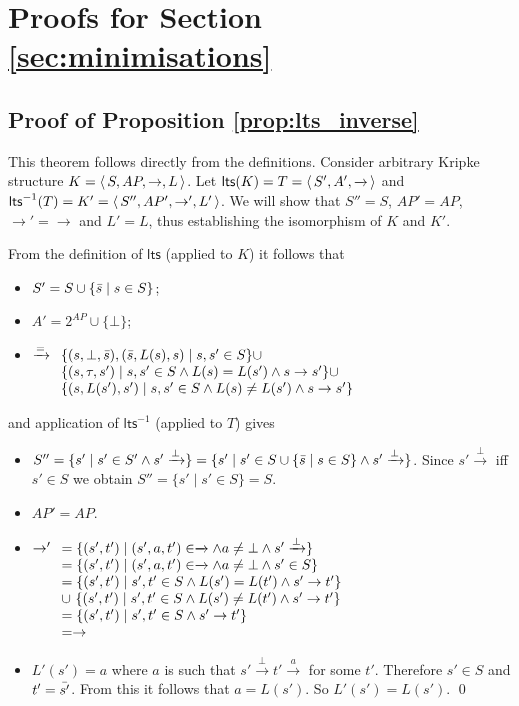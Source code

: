 \documentclass{llncs}
\newcommand{\ltstrans}[1]{\xrightarrow{#1}}
\newcommand{\kstrans}{\to}
\newcommand{\lts}{\mathsf{lts}}
\newcommand{\ltsrev}{\lts^{-1}}
\begin{document}
\section{Proofs for Section \ref{sec:minimisations}}

\subsection{Proof of Proposition \ref{prop:lts_inverse}}
\label{pf:prop:lts_inverse}

This theorem follows directly from the definitions.
Consider arbitrary Kripke structure $K = \tuple{S,AP,\kstrans,L}$. Let $\lts(K) = T= \tuple{ S',A',\ltstrans{}}$ and $\ltsrev(T) = K'=\tuple{S'',AP',\kstrans',L'}$. We will show that $S''=S$, $AP'=AP$, $\kstrans'=\kstrans$ and $L'=L$, thus establishing the isomorphism of $K$ and $K'$.

From the definition of $\lts$ (applied to $K$) it follows that
\begin{itemize}
\item $S'= S \cup \{ \bar{s} \mid s \in S \}$;
\item $A' = 2^{AP} \cup \{ \bot \}$;
\item $\ltstrans = \begin{array}[t]{l}
\{ (s,\bot,\shadow{s}), (\shadow{s},L(s),s) \mid s,s'\in S \} \cup ~ \\
\{ (s,\tau,s') \mid s,s'\in S \land L(s)=L(s') \land s \kstrans s' \} \cup ~ \\
\{ (s,L(s'),s') \mid s,s'\in S \land L(s) \neq L(s') \land s \kstrans s' \}
\end{array}$
\end{itemize}
and application of $\ltsrev$ (applied to $T$) gives
\begin{itemize}
\item $S''= \{ s' \mid s' \in S' \land s' \ltstrans{\bot} \} = \{ s' \mid s' \in S \cup \{ \shadow{s} \mid s \in S \} \land s' \ltstrans{\bot} \}$. Since $s'\ltstrans{\bot}$ iff $s'\in S$ we obtain
    $S'' = \{ s' \mid s' \in S \} = S$.
\item $AP' = AP$.
\item $\kstrans'
\begin{array}[t]{l}
= \{ (s',t') \mid (s',a,t') \in \ltstrans{} \land a \neq \bot \land s' \ltstrans{\bot} \} \\
= \{ (s',t') \mid (s',a,t') \in \ltstrans{} \land a \neq \bot \land s' \in S \} \\
= \{ (s',t') \mid s', t' \in S \land L(s') =L(t') \land s' \kstrans t' \} \\
\cup \ \{ (s',t') \mid s', t' \in S \land L(s') \neq L(t') \land s' \kstrans t' \} \\
= \{ (s',t') \mid s', t' \in S \land s' \kstrans t' \} \\
= \kstrans
\end{array}$
\item $L'(s') = a$ where $a$ is such that $s' \ltstrans{\bot} t' \ltstrans{a}$ for some $t'$. Therefore $s'\in S$ and $t'= \bar{s'}$. From this it follows that $a = L(s')$. So $L'(s')=L(s')$. \qed
\end{itemize}
\end{document}
